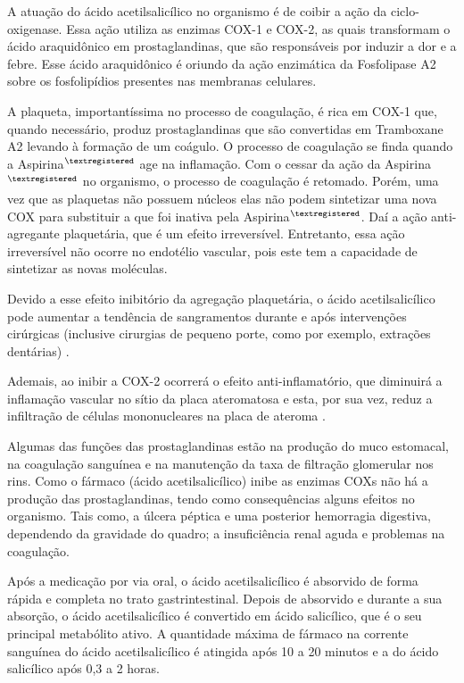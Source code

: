 A atuação do ácido acetilsalicílico no organismo é de coibir a ação da ciclo-oxigenase. Essa ação utiliza
as enzimas COX-1 e COX-2, as quais transformam o ácido araquidônico em prostaglandinas, que são
responsáveis por induzir a dor e a febre. Esse ácido araquidônico é oriundo da ação enzimática da
Fosfolipase A2 sobre os fosfolipídios presentes nas membranas celulares. 

A plaqueta, importantíssima no processo de coagulação, é rica em COX-1 que, quando necessário, produz
prostaglandinas que são convertidas em Tramboxane A2 levando à formação de um coágulo. O processo de
coagulação se finda quando a Aspirina$^{\tiny{\textregistered}}$ age na inflamação. Com o cessar da ação
da Aspirina$^{\tiny{\textregistered}}$ no organismo, o processo de coagulação é retomado. Porém, uma vez
que as plaquetas não possuem núcleos elas não podem sintetizar uma nova COX para substituir a que foi
inativa pela Aspirina$^{\tiny{\textregistered}}$. Daí a ação anti-agregante plaquetária, que é um efeito
irreversível. Entretanto, essa ação irreversível não ocorre no endotélio vascular, pois este tem a
capacidade de sintetizar as novas moléculas. 

Devido a esse efeito inibitório da agregação plaquetária, o ácido acetilsalicílico pode aumentar a
tendência de sangramentos durante e após intervenções cirúrgicas (inclusive cirurgias de pequeno porte,
como por exemplo, extrações dentárias) \cite{bulaaspirina}.

Ademais, ao inibir a COX-2 ocorrerá o efeito anti-inflamatório, que diminuirá a inflamação vascular no
sítio da placa ateromatosa e esta, por sua vez, reduz a infiltração de células mononucleares na placa de
ateroma \cite{Grassi2012}.

Algumas das funções das prostaglandinas estão na produção do muco estomacal, na coagulação sanguínea e na
manutenção da taxa de filtração glomerular nos rins. Como o fármaco (ácido acetilsalicílico) inibe as
enzimas COXs não há a produção das prostaglandinas, tendo como consequências alguns efeitos no organismo.
Tais como, a úlcera péptica e uma posterior hemorragia digestiva, dependendo da gravidade do quadro; a
insuficiência renal aguda e problemas na coagulação. 

Após a medicação por via oral, o ácido acetilsalicílico é absorvido de forma rápida e completa no trato
gastrintestinal. Depois de absorvido e durante a sua absorção, o ácido acetilsalicílico é convertido em
ácido salicílico, que é o seu principal metabólito ativo. A quantidade máxima de fármaco na corrente
sanguínea do ácido acetilsalicílico é atingida após 10 a 20 minutos e a do ácido salicílico após 0,3 a 2
horas. 


